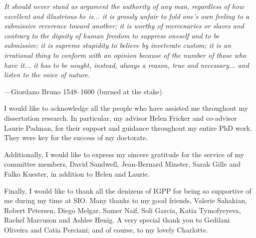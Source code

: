 \begin{frontmatter}
\begin{myepigraph} %
  \vfil
  \centering
  \begin{minipage}{.75\textwidth}
    {\justify
    \emph{
    It should never stand as argument the authority of any man, regardless of how excellent and illustrious he is... it is grossly unfair to fold one's own feeling to a submissive reverence toward another; it is worthy of mercenaries or slaves and contrary to the dignity of human freedom to suppress oneself and to be submissive; it is supreme stupidity to believe by inveterate custom; it is an irrational thing to conform with an opinion because of the number of those who have it... it has to be sought, instead, always a reason, true and necessary... and listen to the voice of nature.
    }
    }
    \begin{flushright}
    ---Giordano Bruno 1548--1600 (burned at the stake)
    \end{flushright}
  \end{minipage}
  \vfil
\end{myepigraph}


%
\setcounter{tocdepth}{1}
\tableofcontents
\listoffigures  %
\listoftables   %



%
%
\begin{acknowledgements} 

I would like to acknowledge all the people who have assisted me throughout my
dissertation research. In particular, my advisor Helen Fricker and co-advisor Laurie Padman, for their support and guidance throughout my entire PhD work. They were key for the success of my doctorate.

Additionally, I would like to express my sincere gratitude for the service of my
committee members, David Sandwell, Jean-Bernard Minster, Sarah Gille and Falko Kuester, in addition to Helen and Laurie.

Finally, I would like to thank all the denizens of IGPP for being so supportive of
me during my time at SIO. Many thanks to my good friends, Valerie Sahakian, Robert Petersen, Diego Melgar, Samer Naif, Soli Garcia, Katia Tymofyeyeva, Rachel Marcuson and Ashlee Henig. A very special thank you to Gedilani Oliveira and Catia Perciani; and of course, to my lovely Charlotte.


\end{acknowledgements}
\end{frontmatter}
